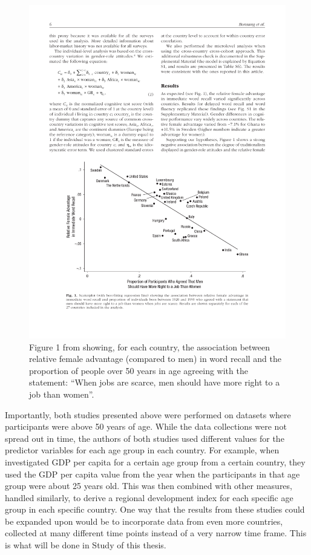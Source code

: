 \begin{figure} \centering \includegraphics[width=120mm]{./Figures/Bonsang2017.pdf} \caption{Figure 1 from \textcite{Bonsang2017} showing, for each country, the association between relative female advantage (compared to men) in word recall and the proportion of people over 50 years in age agreeing with the statement: ``When jobs are scarce, men should have more right to a job than women''.} \label{Figure:Bonsang2017} \end{figure}

Importantly, both studies presented above \parencite{Weber2014,Bonsang2017} were performed on datasets where participants were above 50 years of age. While the data collections were not spread out in time, the authors of both studies used different values for the predictor variables for each age group in each country. For example, when \textcite{Weber2014} investigated GDP per capita for a certain age group from a certain country, they used the GDP per capita value from the year when the participants in that age group were about 25 years old. This was then combined with other measures, handled similarly, to derive a regional development index for each specific age group in each specific country. One way that the results from these studies could be expanded upon would be to incorporate data from even more countries, collected at many different time points instead of a very narrow time frame. This is what will be done in Study  of this thesis.

